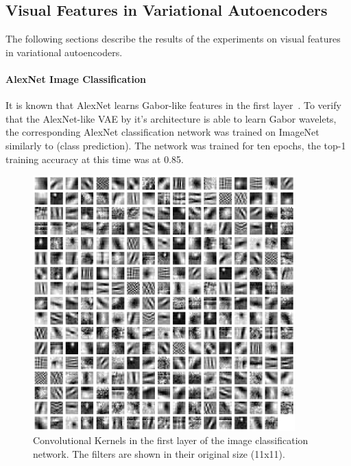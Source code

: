 \subsection{Visual Features in Variational Autoencoders}\label{subsec:results_visual_features_in_variational_autoencoders}
The following sections describe the results of the experiments on visual features in variational autoencoders.

\paragraph{AlexNet Image Classification}
It is known that AlexNet learns Gabor-like features in the first layer~\citep{krizhevsky2012imagenet}.
To verify that the AlexNet-like \ac{VAE} by it's architecture is able to learn Gabor wavelets, the corresponding AlexNet classification network was trained on ImageNet similarly to \citet{krizhevsky2012imagenet} (class prediction).
The network was trained for ten epochs, the top-1 training accuracy at this time was at 0.85.

\begin{figure}
    \centering
    \includegraphics[width=0.9\textwidth]{images/alexnet_classification_l1_kernels.png}
    \caption[Image classification - Layer 1 Kernels]{Convolutional Kernels in the first layer of the image classification network. The filters are shown in their original size (11x11).}
    \label{fig:classification_layer1_kernels}
\end{figure}

